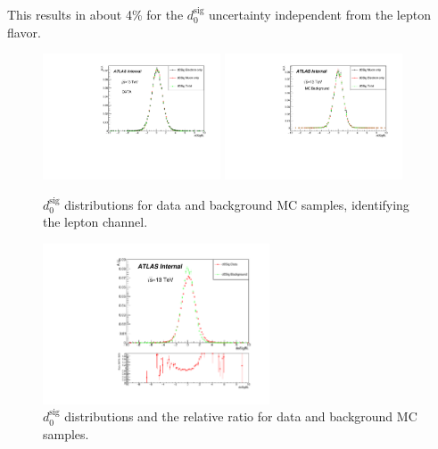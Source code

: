 This results in about 4\% for the $d_{0}^{\textrm{sig}}$ uncertainty independent from the lepton flavor.
\begin{figure}[!h]
\begin{center}
\includegraphics*[width=0.47\textwidth] {figures/d0_data}
\includegraphics*[width=0.47\textwidth] {figures/do_leg}
\caption{$d_{0}^{\textrm{sig}}$ distributions for data and background MC samples, identifying the lepton channel. }
\label{fig:d0lep}
\end{center}
\end{figure}

\begin{figure}[!h]
\begin{center}
\includegraphics*[width=0.6\textwidth] {figures/d0_ratio}
\caption{$d_{0}^{\textrm{sig}}$ distributions and the relative ratio for data and background MC samples. }
\label{fig:d0ratio}
\end{center}
\end{figure}


